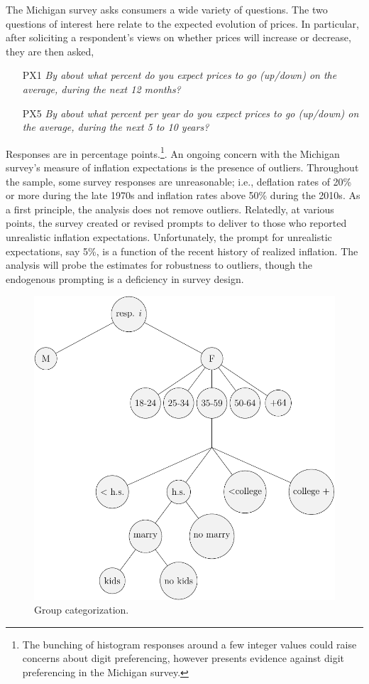 \documentclass[12pt]{article}
\begin{document}
The Michigan survey asks consumers a wide variety of questions. The two questions of interest here relate to the expected evolution of prices. In particular, after soliciting a respondent's views on whether prices will increase or decrease, they are then asked,
\begin{enumerate}
\item[PX1] \emph{By about what percent do you expect prices to go (up/down) on the average, during the next 12 months?}
\item[PX5] \emph{By about what percent per year do you expect prices to go (up/down) on the average, during the next 5 to 10 years?}
\end{enumerate}
Responses are in percentage points.\footnote{The bunching of histogram responses around a few integer values could raise concerns about digit preferencing, however \cite{Branch:JEDC2007} presents evidence against digit preferencing in the Michigan survey.}. An ongoing concern with the Michigan survey's measure of inflation expectations is the presence of outliers. Throughout the sample, some survey responses are unreasonable; i.e., deflation rates of 20\% or more during the late 1970s and inflation rates above 50\% during the 2010s. As a first principle, the analysis does not remove outliers. Relatedly, at various points, the survey created or revised prompts to deliver to those who reported unrealistic inflation expectations. Unfortunately, the prompt for unrealistic expectations, say 5\%, is a function of the recent history of realized inflation. The analysis will probe the estimates for robustness to outliers, though the endogenous prompting is a deficiency in survey design.

\begin{figure}
\centering
\caption{Group categorization.}\label{fig:GroupTree}
\includegraphics[height = \textwidth, width = \textwidth]{figs/GroupCat}
\end{figure}
\end{document}
